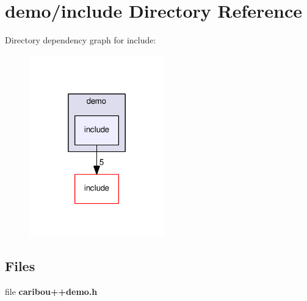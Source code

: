 \section{demo/include Directory Reference}
\label{dir_c417fe8970694d961378a77eb346355e}
Directory dependency graph for include\+:
\nopagebreak
\begin{figure}[H]
\begin{center}
\leavevmode
\includegraphics[width=166pt]{dir_c417fe8970694d961378a77eb346355e_dep}
\end{center}
\end{figure}
\subsection*{Files}
\begin{DoxyCompactItemize}
\item 
file {\bf caribou++demo.\+h}
\end{DoxyCompactItemize}
